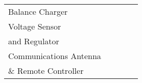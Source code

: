 \begin{table}[H]
\begin{center}
\begin{tabular}{|l|l|l|l|l|}
		Balance Charger        &                                  &                   &                   &          \\
		Voltage Sensor         &                                  &                   &                   &          \\
		and Regulator          &                                  &                   &                   &          \\
		Communications Antenna &                                  &                   &                   &          \\
		\& Remote Controller   &                                  &                   &                   &          \\ \hline
		\end{tabular}
	\end{center}
\end{table}
